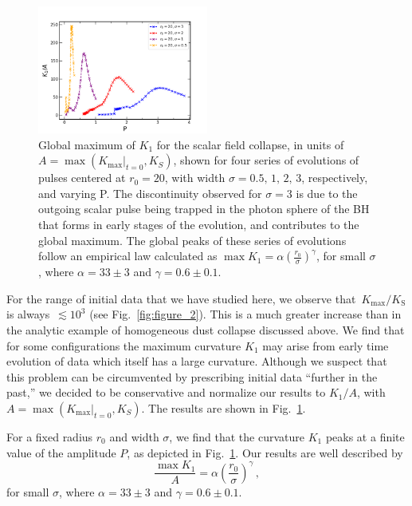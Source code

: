 \documentclass[floats,floatfix,showpacs,amssymb,prd,twocolumn,superscriptaddress,nofootinbib,nolongbibliography,reprint]{revtex4-2}
\newcommand{\be}{\begin{equation}}
\newcommand{\ee}{\end{equation}}
\def\be{\begin{equation}}
\def\ee{\end{equation}}
\begin{document}
\begin{figure}[!h]
    \centering
    \includegraphics[width=0.5\textwidth]{scalarcollapse/GKmaxAvsPs05s1s2s3.png}
    \caption{Global maximum of $K_1$ for the scalar field collapse, in units of $A=\max{\left(\left. K_{\text{max}} \right|_{t=0}, K_S\right)}$, shown for four series of evolutions of pulses centered at $r_0=20$, with width $\sigma=0.5,\,1,\,2,\,3$, respectively, and varying P. The discontinuity observed for $\sigma=3$ is due to the outgoing scalar pulse being trapped in the photon sphere of the BH that forms in early stages of the evolution, and contributes to the global maximum. The global peaks of these series of evolutions follow an empirical law calculated as
    $\max{K_1}=\alpha \left( \frac{r_0}{\sigma} \right)^{\gamma}$, for small $\sigma$, where $\alpha=33\pm 3$ and $\gamma=0.6\pm 0.1$.
    }
    \label{fig:figure_3}
\end{figure}
%
For the range of initial data that we have studied here, we observe that~$K_{\text{max}}/K_{\text{S}}$ is always~$\lesssim10^3$ (see Fig.~\ref{fig:figure_2}). This is a much greater increase than in the analytic example of homogeneous dust collapse discussed above.
We find that for some configurations the maximum curvature $K_1$ may arise from early time evolution of data which itself has a large curvature. Although we suspect that this problem can be circumvented by prescribing initial data ``further in the past,'' we decided to be conservative and normalize our results to $K_1/A$, with $A=\max{\left(\left. K_{\text{max}} \right|_{t=0}, K_S\right)}$. The results are shown in Fig.~\ref{fig:figure_3}.


For a fixed radius $r_0$ and width $\sigma$, we find that the curvature $K_1$ peaks at a finite value of the amplitude $P$, as depicted in Fig.~\ref{fig:figure_3}. Our results are well described by
%
\be
\frac{\max{K_1}}{A}=\alpha \left( \frac{r_0}{\sigma}\right)^{\gamma}\,,\label{max_K1_collapse}
\ee
%
for small $\sigma$, where $\alpha=33\pm 3$ and $\gamma=0.6\pm 0.1$.
\end{document}
